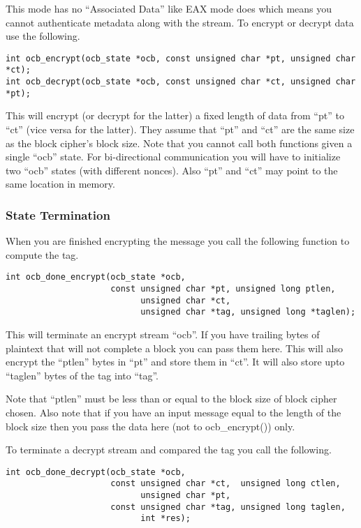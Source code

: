 \documentclass[a4paper]{book}
\begin{document}
This mode has no ``Associated Data'' like EAX mode does which means you cannot authenticate metadata along with the stream.
To encrypt or decrypt data use the following.

 
\begin{verbatim}
int ocb_encrypt(ocb_state *ocb, const unsigned char *pt, unsigned char *ct);
int ocb_decrypt(ocb_state *ocb, const unsigned char *ct, unsigned char *pt);
\end{verbatim}

This will encrypt (or decrypt for the latter) a fixed length of data from ``pt'' to ``ct'' (vice versa for the latter).  
They assume that ``pt'' and ``ct'' are the same size as the block cipher's block size.  Note that you cannot call 
both functions given a single ``ocb'' state.  For bi-directional communication you will have to initialize two ``ocb''
states (with different nonces).  Also ``pt'' and ``ct'' may point to the same location in memory.

\subsubsection{State Termination}

When you are finished encrypting the message you call the following function to compute the tag.

\begin{verbatim}
int ocb_done_encrypt(ocb_state *ocb, 
                     const unsigned char *pt, unsigned long ptlen,
                           unsigned char *ct, 
                           unsigned char *tag, unsigned long *taglen);
\end{verbatim}

This will terminate an encrypt stream ``ocb''.  If you have trailing bytes of plaintext that will not complete a block 
you can pass them here.  This will also encrypt the ``ptlen'' bytes in ``pt'' and store them in ``ct''.  It will also
store upto ``taglen'' bytes of the tag into ``tag''.

Note that ``ptlen'' must be less than or equal to the block size of block cipher chosen.  Also note that if you have 
an input message equal to the length of the block size then you pass the data here (not to ocb\_encrypt()) only.  

To terminate a decrypt stream and compared the tag you call the following.

\begin{verbatim}
int ocb_done_decrypt(ocb_state *ocb, 
                     const unsigned char *ct,  unsigned long ctlen,
                           unsigned char *pt, 
                     const unsigned char *tag, unsigned long taglen, 
                           int *res);
\end{verbatim}
\end{document}
